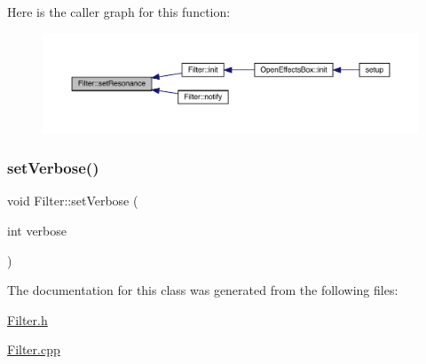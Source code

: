Here is the caller graph for this function\+:\nopagebreak
\begin{figure}[H]
\begin{center}
\leavevmode
\includegraphics[width=350pt]{class_filter_a9bd50f058259b8c3bc83daf99cdc9837_icgraph}
\end{center}
\end{figure}
\mbox{\label{class_filter_aff18613de2ab3bc90035babc58c7b055}} 
\subsubsection{\texorpdfstring{set\+Verbose()}{setVerbose()}}
{\footnotesize\ttfamily void Filter\+::set\+Verbose (\begin{DoxyParamCaption}\item[{int}]{verbose }\end{DoxyParamCaption})}



The documentation for this class was generated from the following files\+:\begin{DoxyCompactItemize}
\item 
\mbox{\hyperlink{_filter_8h}{Filter.\+h}}\item 
\mbox{\hyperlink{_filter_8cpp}{Filter.\+cpp}}\end{DoxyCompactItemize}
